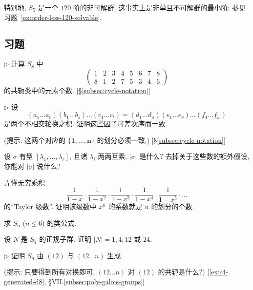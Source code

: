 特别地, $S_5$ 是一个 $120$ 阶的非可解群. 这事实上是非单且不可解群的最小阶; 参见习题~\ref{ex:order-less-120-solvable}.

\subsection*{习题}
{}

\begin{prob}
\label{ex:conj-class-size}
$\triangleright$ 计算 $S_8$ 中
\[
\begin{pmatrix} 1 & 2 & 3 & 4 & 5 & 6 & 7 & 8 \\ 8 & 1 & 2 & 7 & 5 & 3 & 4 & 6 \end{pmatrix}
\]
的共轭类中的元素个数. [§\ref{subsec:cycle-notation}]
\end{prob}

\begin{prob}
\label{ex:cycle-unique}
$\triangleright$ 设
\[
(a_1 \dots a_r)(b_1 \dots b_s)\dots(c_1 \dots c_t) = (d_1 \dots d_u)(e_1 \dots e_v)\dots(f_1 \dots f_w)
\]
是两个不相交轮换之积. 证明这些因子可差次序而一致.

(提示: 这两个对应的 $\{\mathbf{1},\dots,\mathbf{n}\}$ 的划分必须一致.) [§\ref{subsec:cycle-notation}]
\end{prob}

\begin{prob}
\label{ex:cycle-order}
设 $\sigma$ 有型 $[\lambda_1,\dots,\lambda_r]$, 且诸 $\lambda_i$ 两两互素. $|\sigma|$ 是什么? 去掉关于这些数的额外假设, 你能对 $|\sigma|$ 说什么?
\end{prob}

\begin{prob}
\label{ex:partition-generating}
弄懂无穷乘积
\[
\frac{1}{1 - x} \cdot \frac{1}{1 - x^2} \cdot \frac{1}{1 - x^3} \cdot \frac{1}{1 - x^4} \cdot \frac{1}{1 - x^5} \cdot \dots
\]
的``Taylor 级数''. 证明该级数中 $x^n$ 的系数就是 $n$ 的划分的个数.
\end{prob}

\begin{prob}
\label{ex:class-formula-small}
求 $S_n$ ($n \leq 6$) 的类公式.
\end{prob}

\begin{prob}
\label{ex:s4-normal-size}
设 $N$ 是 $S_4$ 的正规子群. 证明 $|N| = 1, 4, 12$ 或 $24$.
\end{prob}

\begin{prob}
\label{ex:sn-generated}
$\triangleright$ 证明 $S_n$ 由 $(12)$ 与 $(12\dots n)$ 生成.

(提示: 只要得到所有对换即可. $(12\dots n)$ 对 $(12)$ 的共轭是什么?) [\ref{ex:s4-generated-d8}, §VII.\ref{subsec:poly-galois-groups}]
\end{prob}

